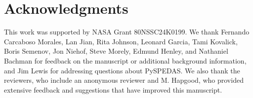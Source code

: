 \documentclass[draft]{agujournal2019}
\begin{document}

\section*{Acknowledgments}

This work was supported by NASA Grant 80NSSC24K0199. We thank Fernando Carcaboso Morales, Lan Jian, Rita Johnson, Leonard Garcia, Tami Kovalick, Boris Semenov, Jon Niehof, Steve Morely, Edmund Henley, and Nathaniel Bachman for feedback on the manuscript or additional background information, and Jim Lewis for addressing questions about PySPEDAS. We also thank the reviewers, who include an anonymous reviewer and M. Hapgood, who provided extensive feedback and suggestions that have improved this manuscript.

{\raggedright }
\end{document}
